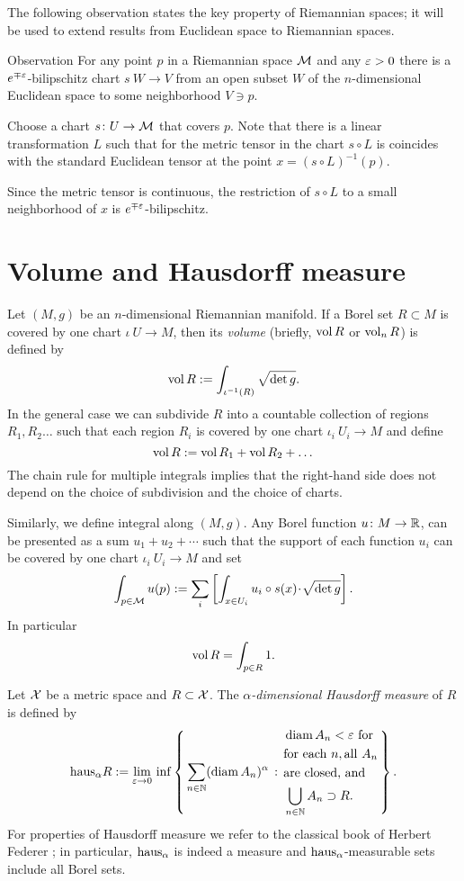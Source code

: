 The following observation states the key property of Riemannian spaces;
it will be used to extend results from Euclidean space to Riemannian spaces.

\begin{thm}{Observation}\label{obs:lip-chart}
For any point $p$ in a Riemannian space $\mathcal{M}$ and any $\varepsilon>0$ there is a $e^{\mp\varepsilon}$-bilipschitz chart $s\:W\to V$ from an open subset $W$ of the $n$-dimensional Euclidean space to some neighborhood $V\ni p$.
\end{thm}

Choose a chart $s\colon U\to \mathcal{M}$ that covers $p$.
Note that there is a linear transformation $L$ such that for the metric tensor in the chart $s\circ L$ is coincides with the standard Euclidean tensor at the point $x=(s\circ L)^{-1}(p)$.

Since the metric tensor is continuous, the restriction of $s\circ L$ to a small neighborhood of $x$ is $e^{\mp\varepsilon}$-bilipschitz.
\qeds

\section{Volume and Hausdorff measure}\label{sec:vol-haus}

Let $(M,g)$ be an $n$-dimensional Riemannian manifold.
If a Borel set $R\subset M$ is covered by one chart $\iota\:U\to M$,
then its \emph{volume} (briefly, $\operatorname{\rm vol}\nolimits R$ or $\operatorname{\rm vol}\nolimits_n R$) is defined by 
\[\operatorname{\rm vol}\nolimits R
\mathrel{:=}
\int_{\iota^{-1}(R)}\sqrt{\det{g}}.\]
In the general case we can subdivide $R$ into a countable collection of regions $R_1,R_2\dots$ such that each region $R_i$ is covered by one chart $\iota_i\:U_i\to M$ and define
\[\operatorname{\rm vol}\nolimits R\mathrel{:=} \operatorname{\rm vol}\nolimits R_1+\operatorname{\rm vol}\nolimits R_2+\dots\]
The chain rule for multiple integrals implies that the right-hand side does not depend on the choice of subdivision and the choice of charts.

Similarly, we define integral along $(M,g)$.
Any Borel function $u\:M\z\to \RR$, can be presented as a sum $u_1+u_2+\cdots$ such that the support of each function $u_i$ can be covered by one chart $\iota_i\:U_i\to M$
and set 
\[\int_{p\in\spc{M}} u(p)
\df
\sum_i\left[\int_{x\in U_i} u_i\circ s(x)\cdot\sqrt{\det{g}}\right].
\]
In particular
\[\operatorname{\rm vol}\nolimits R=\int_{p\in R} 1.\]

Let $\mathcal{X}$ be a metric space and $R\subset \mathcal{X}$.
The \emph{$\alpha$-dimensional Hausdorff measure} of $R$ is defined by 
$$\mathrm{haus}_\alpha R
\mathrel{:=}
\lim_{\varepsilon\to0}
\,
\inf
\left\{\,{\sum_{n\in\mathbb{N}}(\operatorname{\rm diam}\nolimits A_n)^\alpha}\,:\,{\begin{aligned}
&\operatorname{\rm diam}\nolimits A_n<\varepsilon\ \text{for}
\\
&\text{for each}\ n,\text{all}\  A_n
\\
&\text{are closed, and} 
\\
& \bigcup_{n\in\mathbb{N}}A_n\supset R.
\end{aligned}
}\,\right\}.$$
For properties of Hausdorff measure we refer to the classical book of  Herbert Federer \cite{federer};
in particular, $\mathrm{haus}_\alpha$ is indeed a measure and $\mathrm{haus}_\alpha$-measurable sets include all Borel sets.

